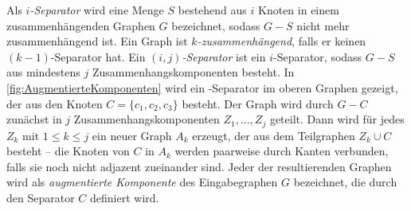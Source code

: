 Als \emph{$i$-Separator} wird eine Menge $S$ bestehend aus $i$ Knoten in einem zusammenhängenden Graphen $G$ bezeichnet, sodass $G - S$ nicht mehr zusammenhängend ist.
Ein Graph ist \emph{$k$-zusammenhängend}, falls er keinen $(k-1)$-Separator hat.
Ein \emph{$(i, j)$-Separator} ist ein $i$-Separator, sodass $G-S$ aus mindestens $j$ Zusammenhangskomponenten besteht.
In \Abb \ref{fig:AugmentierteKomponenten} wird ein \dd-Separator im oberen Graphen gezeigt, der aus den Knoten $C = \{c_1, c_2, c_3\}$ besteht.
Der Graph wird durch $G - C$ zunächst in $j$ Zusammenhangskomponenten $Z_1, ..., Z_j$ geteilt.
Dann wird für jedes $Z_k$ mit $1 \leq k \leq j$ ein neuer Graph $A_k$ erzeugt, der aus dem Teilgraphen $Z_k \cup C$ besteht -- die Knoten von $C$ in $A_k$ werden paarweise durch Kanten verbunden, falls sie noch nicht adjazent zueinander sind.
Jeder der resultierenden Graphen wird als \emph{augmentierte Komponente} des Eingabegraphen $G$ bezeichnet, die durch den Separator $C$ definiert wird.

